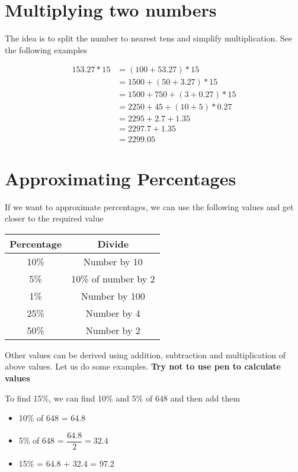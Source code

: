 \section{Multiplying two numbers}
The idea is to split the number to nearest tens and simplify multiplication. See the following examples

\begin{align*}
    153.27 * 15 &= (100 + 53.27) * 15 \\
    &= 1500 + (50 + 3.27) * 15 \\
    &= 1500 + 750 + (3 + 0.27) * 15 \\
    &= 2250 + 45 + (10 + 5) * 0.27 \\
    &= 2295 + 2.7 + 1.35 \\
    &= 2297.7 + 1.35 \\
    &= 2299.05
\end{align*}

\section{Approximating Percentages}
If we want to approximate percentages, we can use the following values and get closer to the required value 

\begin{table}[h!]
    \centering
    \begin{tabular}{|| c | c ||}
        \hline
         \textbf{Percentage} & \textbf{Divide}\\
        \hline
         10\% & Number by 10 \\
        \hline
         5\% & 10\% of number by 2 \\
        \hline
         1\% & Number by 100 \\
        \hline
         25\% & Number by 4 \\
        \hline
         50\% & Number by 2 \\
        \hline
    \end{tabular}
\end{table}

Other values can be derived using addition, subtraction and multiplication of above values. Let us do some examples. \textbf{Try not to use pen to calculate values}
\newpage


To find 15\%, we can find 10\% and 5\% of 648 and then add them
\begin{itemize}
    \item 10\% of 648 = 64.8
    \item 5\% of 648 = $\dfrac{64.8}{2} = 32.4$
    \item 15\% = 64.8 + 32.4 = 97.2
\end{itemize}

